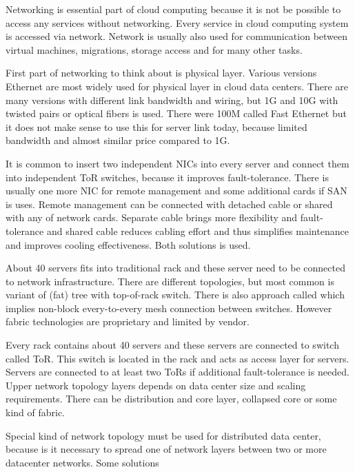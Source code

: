 

Networking is essential part of cloud computing because it is not be possible to access any services without networking. Every service in cloud computing system is accessed via network. Network is usually also used for communication between virtual machines, migrations, storage access and for many other tasks.


First part of networking to think about is physical layer. Various versions Ethernet are most widely used for physical layer in cloud data centers. There are many versions with different link bandwidth and wiring, but 1G and 10G with twisted pairs or optical fibers is used. There were 100M called Fast Ethernet but it does not make sense to use this for server link today, because limited bandwidth and almost similar price compared to 1G.

It is common to insert two independent \Ac{NIC}s into every server and connect them into independent \Ac{ToR} switches, because it improves fault-tolerance. There is usually one more \Ac{NIC} for remote management and some additional cards if \Ac{SAN} is uses. Remote management can be connected with detached cable or shared with any of network cards. Separate cable brings more flexibility and fault-tolerance and shared cable reduces cabling effort and thus simplifies maintenance and improves cooling effectiveness. Both solutions is used.

About 40 servers fits into traditional rack and these server need to be connected to network infrastructure. There are different topologies, but most common is variant of (fat) tree with top-of-rack switch. There is also approach called  which implies non-block every-to-every mesh connection between switches. However fabric technologies are proprietary and limited by vendor.

Every rack contains about 40 servers and these servers are connected to switch called \Ac{ToR}. This switch is located in the rack and acts as access layer for servers. Servers are connected to at least two \Ac{ToR}s if additional fault-tolerance is needed. Upper network topology layers depends on data center size and scaling requirements. There can be distribution and core layer, collapsed core or some kind of fabric.

Special kind of network topology must be used for distributed data center, because is it necessary to spread one of network layers between two or more datacenter networks. Some solutions 





